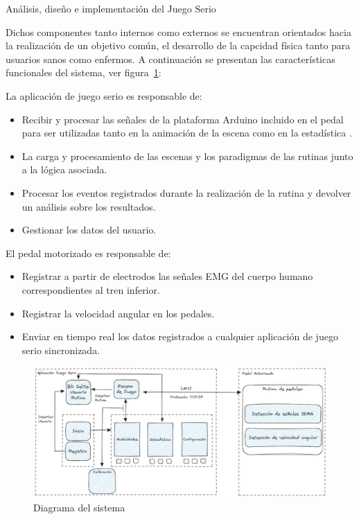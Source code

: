 \begin{thesischapter}{2} {Análisis, diseño e implementación del Juego Serio}
    
    Dichos componentes tanto internos como externos se encuentran orientados hacia 
    la realización de un objetivo común, el desarrollo de la capcidad física tanto para usuarios 
    sanos como enfermos. A continuación se presentan las características funcionales 
    del sistema, ver figura~\ref{fig: system}:

    \vspace{10pt}
    La aplicación de juego serio es responsable de:
    \begin{itemize}
        \item Recibir y procesar las señales de la plataforma Arduino incluido en el pedal para ser utilizadas tanto en la 
              animación de la escena como en la estadística .
        \item La carga y procesamiento de las escenas y los paradigmas de las rutinas junto a la lógica asociada. 
        \item Procesar los eventos registrados durante la realización de la rutina y devolver un análisis sobre los resultados.
        \item Gestionar los datos del usuario.
    \end{itemize}

    \vspace{10pt}
    El pedal motorizado es responsable de:
    \begin{itemize}
        \item Registrar a partir de electrodos las señales EMG del cuerpo humano correspondientes al tren inferior.
        \item Registrar la velocidad angular en los pedales.
        \item Enviar en tiempo real los datos registrados a cualquier aplicación de juego serio sincronizada.
    \end{itemize}
    
    \begin{figure}[ht]
        \centering
        \includegraphics[scale=0.38]{images/system.jpg}
        \caption{Diagrama del sistema}
        \label{fig: system}
    \end{figure} 
    

\end{thesischapter}
